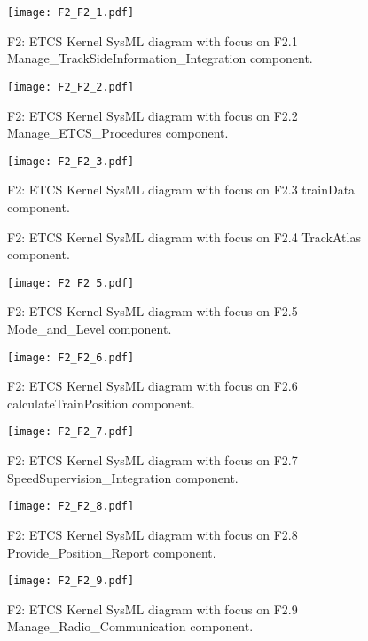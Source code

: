 \begin{figure}
\center
\texttt{[image: F2\_F2\_1.pdf]}
\caption{F2: ETCS Kernel SysML diagram with focus on F2.1 Manage\_TrackSideInformation\_Integration component.}\label{f:f2.1_overview}
\end{figure}

\begin{figure}
\center
\texttt{[image: F2\_F2\_2.pdf]}
\caption{F2: ETCS Kernel SysML diagram with focus on F2.2 Manage\_ETCS\_Procedures component.}\label{f:f2.2_overview}
\end{figure}

\begin{figure}
\center
\texttt{[image: F2\_F2\_3.pdf]}
\caption{F2: ETCS Kernel SysML diagram with focus on F2.3 trainData component.}\label{f:f2.3_overview}
\end{figure}

\begin{figure}
\center
{}
\caption{F2: ETCS Kernel SysML diagram with focus on F2.4 TrackAtlas component.}\label{f:f2.4_overview}
\end{figure}

\begin{figure}
\center
\texttt{[image: F2\_F2\_5.pdf]}
\caption{F2: ETCS Kernel SysML diagram with focus on F2.5 Mode\_and\_Level component.}\label{f:f2.5_overview}
\end{figure}

\begin{figure}
\center
\texttt{[image: F2\_F2\_6.pdf]}
\caption{F2: ETCS Kernel SysML diagram with focus on F2.6 calculateTrainPosition component.}\label{f:f2.6_overview}
\end{figure}

\begin{figure}
\center
\texttt{[image: F2\_F2\_7.pdf]}
\caption{F2: ETCS Kernel SysML diagram with focus on F2.7 SpeedSupervision\_Integration component.}\label{f:f2.7_overview}
\end{figure}

\begin{figure}
\center
\texttt{[image: F2\_F2\_8.pdf]}
\caption{F2: ETCS Kernel SysML diagram with focus on F2.8 Provide\_Position\_Report component.}\label{f:f2.8_overview}
\end{figure}

\begin{figure}
\center
\texttt{[image: F2\_F2\_9.pdf]}
\caption{F2: ETCS Kernel SysML diagram with focus on F2.9 Manage\_Radio\_Communication component.}\label{f:f2.9_overview}
\end{figure}

